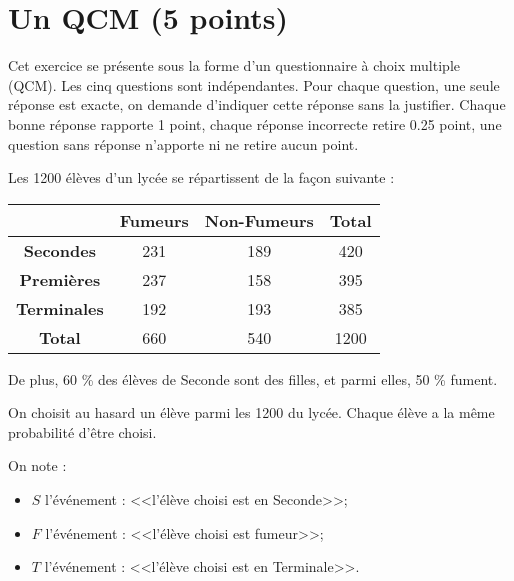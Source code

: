 \section{Un QCM (5 points)}

Cet exercice se présente sous la forme d'un questionnaire à choix multiple (QCM). Les cinq questions sont indépendantes. Pour chaque question, une seule réponse est exacte, on demande d'indiquer cette réponse sans la justifier. Chaque bonne réponse rapporte 1 point, chaque réponse incorrecte retire \num{0.25} point, une question sans réponse n'apporte ni ne retire aucun point.

Les 1200 élèves d'un lycée se répartissent de la façon suivante :

\begin{center}
	\begin{tabular}{|@{\ }c@{\ }|@{\ }c@{\ }|@{\ }c@{\ }|@{\ }c@{\ }|}
	\hline
	& \textbf{Fumeurs} & \textbf{Non-Fumeurs} & \textbf{Total} \\ \hline
	\textbf{Secondes}   & 231              & 189                  & 420            \\ \hline
	\textbf{Premières}  & 237              & 158                  & 395            \\ \hline
	\textbf{Terminales} & 192              & 193                  & 385            \\ \hline
	\textbf{Total}      & 660              & 540                  & 1200           \\ \hline
\end{tabular}

\end{center}

De plus, 60 \% des élèves de Seconde sont des filles, et parmi elles, 50 \% fument.

On choisit au hasard un élève parmi les 1200 du lycée. Chaque élève a la même probabilité d'être choisi.

On note :
\begin{itemize}
	\item $S$ l'événement : <<l'élève choisi est en Seconde>>;
	\item $F$ l'événement : <<l'élève choisi est fumeur>>;
	\item $T$ l'événement : <<l'élève choisi est en Terminale>>.
\end{itemize}


